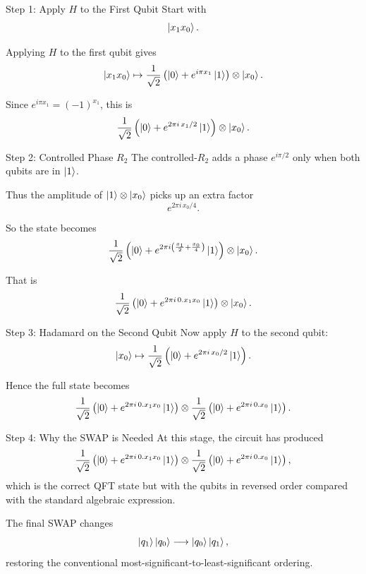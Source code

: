\documentclass{beamer}
\begin{document}

\begin{frame}{Step 1: Apply \(H\) to the First Qubit}
Start with
\[
\ket{x_1x_0}.
\]

Applying \(H\) to the first qubit gives
\[
\ket{x_1x_0}
\mapsto
\frac{1}{\sqrt{2}}
\left(\ket{0}+e^{i\pi x_1}\ket{1}\right)\otimes \ket{x_0}.
\]

Since \(e^{i\pi x_1}=(-1)^{x_1}\), this is
\[
\frac{1}{\sqrt{2}}
\left(\ket{0}+e^{2\pi i \, x_1/2}\ket{1}\right)\otimes \ket{x_0}.
\]
\end{frame}


\begin{frame}{Step 2: Controlled Phase \(R_2\)}
The controlled-\(R_2\) adds a phase \(e^{i\pi/2}\) only when both qubits are in \(\ket{1}\).

Thus the amplitude of \(\ket{1}\otimes\ket{x_0}\) picks up an extra factor
\[
e^{2\pi i\, x_0/4}.
\]

So the state becomes
\[
\frac{1}{\sqrt{2}}
\left(
\ket{0}
+
e^{2\pi i \left(\frac{x_1}{2}+\frac{x_0}{4}\right)}
\ket{1}
\right)\otimes \ket{x_0}.
\]

That is
\[
\frac{1}{\sqrt{2}}
\left(
\ket{0}
+
e^{2\pi i\, 0.x_1x_0}\ket{1}
\right)\otimes \ket{x_0}.
\]
\end{frame}


\begin{frame}{Step 3: Hadamard on the Second Qubit}
Now apply \(H\) to the second qubit:
\[
\ket{x_0}
\mapsto
\frac{1}{\sqrt{2}}
\left(\ket{0}+e^{2\pi i\,x_0/2}\ket{1}\right).
\]

Hence the full state becomes
\[
\frac{1}{\sqrt{2}}
\left(
\ket{0}
+
e^{2\pi i\,0.x_1x_0}\ket{1}
\right)
\otimes
\frac{1}{\sqrt{2}}
\left(
\ket{0}
+
e^{2\pi i\,0.x_0}\ket{1}
\right).
\]
\end{frame}


\begin{frame}{Step 4: Why the SWAP is Needed}
At this stage, the circuit has produced
\[
\frac{1}{\sqrt{2}}
\left(
\ket{0}
+
e^{2\pi i\,0.x_1x_0}\ket{1}
\right)
\otimes
\frac{1}{\sqrt{2}}
\left(
\ket{0}
+
e^{2\pi i\,0.x_0}\ket{1}
\right),
\]
which is the correct QFT state but with the qubits in reversed order compared with the standard algebraic expression.

The final SWAP changes
\[
\ket{q_1}\ket{q_0}\longrightarrow \ket{q_0}\ket{q_1},
\]
restoring the conventional most-significant-to-least-significant ordering.
\end{frame}
\end{document}
